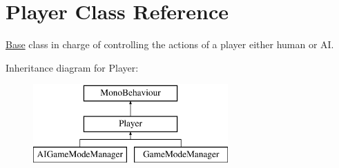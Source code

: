 \hypertarget{class_player}{}\section{Player Class Reference}
\label{class_player}


\mbox{\hyperlink{class_base}{Base}} class in charge of controlling the actions of a player either human or AI.  


Inheritance diagram for Player\+:\begin{figure}[H]
\begin{center}
\leavevmode
\includegraphics[height=3.000000cm]{class_player}
\end{center}
\end{figure}
